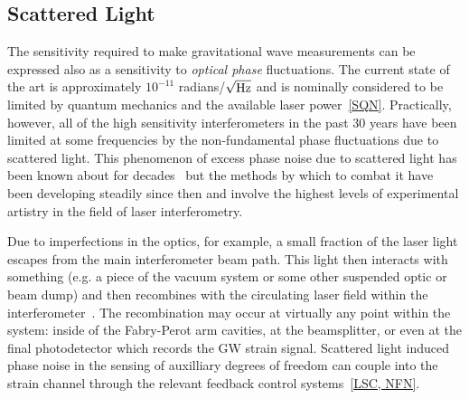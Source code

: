 %


\subsection{Scattered Light}
\label{s:IDC:scatter}
The sensitivity required to make gravitational wave measurements can be expressed also
as a sensitivity to \textit{optical phase} fluctuations. The current state of the art
is approximately $10^{-11}$ radians/$\sqrt{\rm Hz}$ and is nominally considered to be limited
by quantum mechanics and the available laser power~\ref{SQN}. Practically, however,
all of the high sensitivity interferometers in the past 30 years have been limited
at some frequencies by the non-fundamental phase fluctuations due to scattered light.
This phenomenon of excess phase
noise due to scattered light has been known about for decades~\cite{Schilling:1981}
but the methods by which to combat it have been developing steadily since then and
involve the highest levels of experimental artistry in the field of laser interferometry.

Due to imperfections in the optics, for example, a small fraction of the laser light escapes from
the main interferometer beam path. This light then interacts with something (e.g. a piece of the
vacuum system or some other suspended optic or beam dump) and then recombines with the
circulating laser field within the
interferometer~\cite{Kip:Scatter95, Kip:scatter1989, Sam:Scatter2012,
Stefano:Scatter, vinet1997scattered, fritschel1998high}.
The recombination may occur at virtually any point within the system: inside of the
Fabry-Perot arm cavities, at the beamsplitter, or even at the final photodetector which
records the GW strain signal. Scattered light induced phase noise in the sensing
of auxilliary degrees of freedom can couple into the strain channel through the
relevant feedback control systems~\ref{LSC, NFN}.

